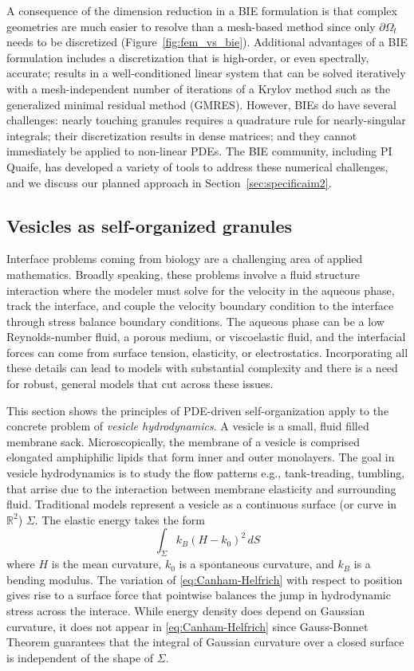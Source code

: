 A consequence of the dimension reduction in a BIE formulation is that
complex geometries are much easier to resolve than a mesh-based method
since only $\partial \Omega_t$ needs to be discretized
(Figure~\ref{fig:fem_vs_bie}). Additional advantages of a BIE
formulation includes a discretization that is high-order, or even
spectrally, accurate; results in a well-conditioned linear system that
can be solved iteratively with a mesh-independent number of iterations
of a Krylov method such as the generalized minimal residual method
(GMRES). However, BIEs do have several challenges: nearly touching
granules requires a quadrature rule for nearly-singular integrals; their
discretization results in dense matrices; and they cannot immediately be
applied to non-linear PDEs. The BIE community, including PI Quaife, has
developed a variety of tools to address these numerical challenges, and
we discuss our planned approach in Section~\ref{sec:specificaim2}.


\subsection{Vesicles as self-organized granules}
\label{sec:vesicles_as_granules}
Interface problems coming from biology are a challenging
area of applied mathematics.  Broadly speaking, these problems
involve a fluid structure interaction where the modeler must
solve for the velocity in the aqueous phase, track the interface,
and couple the velocity boundary condition to the interface through
stress balance boundary conditions.  The aqueous phase can
be a low Reynolds-number fluid, a porous medium, or viscoelastic fluid,
and the interfacial forces can come from surface tension, elasticity,
or electrostatics.
Incorporating all these details can lead to models with substantial
complexity and there is a need for robust, general models that
cut across these issues. 

This section shows the principles of PDE-driven
self-organization apply to the concrete
problem of \emph{vesicle hydrodynamics}.
A vesicle is a small, fluid filled membrane sack.
Microscopically, the membrane of a vesicle is comprised
elongated amphiphilic lipids that form inner and outer monolayers.  
The goal in vesicle hydrodynamics is to study the flow patterns e.g.,
tank-treading, tumbling, that arrise due to the interaction
between membrane elasticity and surrounding fluid.
Traditional models represent a vesicle as a
continuous surface (or curve in $\mathbb{R}^2$) $\Sigma$.
The elastic energy takes the form
\begin{equation}
\label{eq:Canham-Helfrich}
  \int_{\Sigma} k_B(H - k_0)^2\, dS 
\end{equation}
where $H$ is the mean curvature, $k_0$ is a spontaneous curvature,
and $k_B$ is a bending modulus. 
The variation of \eqref{eq:Canham-Helfrich} with respect to position
gives rise to a surface force
that pointwise balances the jump in hydrodynamic stress across the interace.
While energy density does depend on Gaussian curvature,
it does not appear in \eqref{eq:Canham-Helfrich}
since Gauss-Bonnet Theorem guarantees that
the integral of Gaussian curvature over a closed surface is independent of the shape of $\Sigma$.


